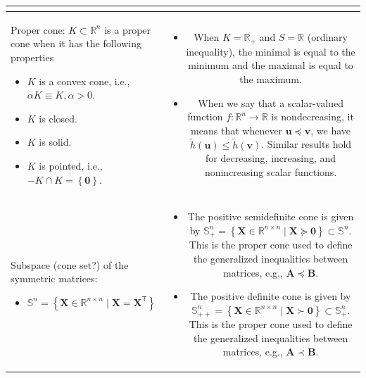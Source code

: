 \documentclass{article}
\begin{document}
\begin{xltabular}{\textwidth}{|A|C|}
\begin{itemize}[leftmargin=*]
	\end{itemize} \\
	\hline
	Proper cone: \(K \subset \mathbb{R}^{n}\) is a proper cone when it has the following properties
	\begin{itemize}
		\item \(K\) is a convex cone, i.e., \(\alpha K \equiv K, \alpha > 0\).
		\item \(K\) is closed.
		\item \(K\) is solid.
		\item \(K\) is pointed, i.e., \(-K \cap K = \left\{ \mathbf{0} \right\}\).
	\end{itemize} & \vspace{-3.5ex} \begin{itemize}[leftmargin=*]
		\item When \(K = \mathbb{R}_{+}\) and \(S = \mathbb{R}\) (ordinary inequality), the minimal is equal to the minimum and the maximal is equal to the maximum.
		\item When we say that a scalar-valued function \(f: \mathbb{R}^{n} \rightarrow \mathbb{R}\) is nondecreasing, it means that whenever \(\mathbf{u}\preceq \mathbf{v}\), we have \(\tilde{h}(\mathbf{u})\leq \tilde{h}(\mathbf{v})\). Similar results hold for decreasing, increasing, and nonincreasing scalar functions.
	\end{itemize} \\
	\hline
	Subspace (cone set?) of the symmetric matrices:
	\begin{itemize}
		\item \(\mathbb{S}^n = \left\{ \mathbf{X} \in \mathbb{R}^{n\times n} \mid \mathbf{X} = \mathbf{X}^\mathsf{T}\right\}\)
	\end{itemize} & \vspace{-3.5ex} \begin{itemize}[leftmargin=*]
		\item The positive semidefinite cone is given by \(\mathbb{S}^n_+ = \left\{ \mathbf{X} \in \mathbb{R}^{n\times n} \mid \mathbf{X} \succeq \mathbf{0} \right\} \subset \mathbb{S}^n\). This is the proper cone used to define the generalized inequalities between matrices, e.g., \(\mathbf{A} \preceq \mathbf{B}\).
		\item The positive definite cone is given by \(\mathbb{S}^n_{++} = \left\{ \mathbf{X} \in \mathbb{R}^{n\times n} \mid \mathbf{X} \succ \mathbf{0} \right\}\subset \mathbb{S}^n_+ \). This is the proper cone used to define the generalized inequalities between matrices, e.g., \(\mathbf{A} \prec \mathbf{B}\).

\end{itemize}
\end{xltabular}
\end{document}
